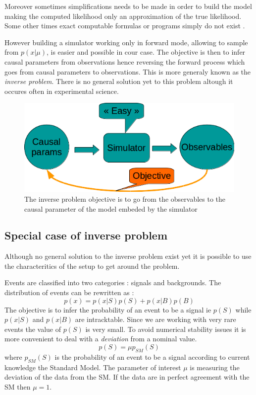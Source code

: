 Moreover sometimes simplifications needs to be made in order to build the model \needcite making the computed likelihood only an approximation of the true likelihood.
Some other times exact computable formulas or programs simply do not exist \needcite.



However building a simulator working only in forward mode, \ie allowing to sample from $p(x|\mu)$, is easier and possible in cour case.
The objective is then to infer causal parameters from observations hence reversing the forward process which goes from causal parameters to observations.
This is more generaly known as the \emph{inverse problem}.
There is no general solution yet to this problem altough it occures often in experimental science.


\begin{figure}[htb]
    \centering
    \includegraphics[width=0.8\linewidth]{inverse_problem}
    \caption{The inverse problem objective is to go from the observables to the causal parameter of the model embeded by the simulator}
    \label{fig:inverse_problem}
\end{figure}



\subsection{Special case of inverse problem} %
\label{sub:special_case_of_inverse_problem}

Although no general solution to the inverse problem exist yet it is possible to use the characteritics of the setup to get around the problem.

Events are classified into two categories : signals and backgrounds.
The distribution of events can be rewritten as :
\begin{equation}
 	p(x) = p(x|S) p(S) + p(x|B) p(B)
\end{equation}
The objective is to infer the probability of an event to be a signal ie $p(S)$ while $p(x|S)$ and $p(x|B)$ are intracktable.
Since we are working with very rare events the value of $p(S)$ is very small.
To avoid numerical stability issues it is more convenient to deal with a \emph{deviation} from a nominal value.
\begin{equation}
\label{eq:mu_definition}
	p(S) = \mu p_{SM}(S)
\end{equation}
where $p_{SM}(S)$ is the probability of an event to be a signal according to current knowledge \ie the Standard Model.
The parameter of interest $\mu$ is measuring the deviation of the data from the SM.
If the data are in perfect agreement with the SM then $\mu=1$.

